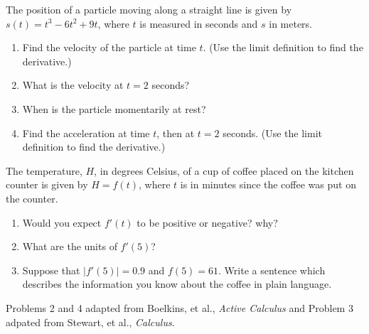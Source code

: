 \documentclass{ximera}
\begin{document}
\begin{exercise}
    The position of a particle moving along a straight line is given by $s(t)=t^3-6t^2+9t$, where $t$ is measured in seconds and $s$ in meters.
    \begin{enumerate}
        \item Find the velocity of the particle at time $t$. (Use the limit definition to find the derivative.)
        \item What is the velocity at $t=2$ seconds?
        \item When is the particle momentarily at rest? 
        \item Find the acceleration at time $t$, then at $t=2$ seconds. (Use the limit definition to find the derivative.)
    \end{enumerate}
\end{exercise}

\begin{exercise}
    The temperature, $H$, in degrees Celsius, of a cup of coffee placed on the kitchen counter is given by $H=f(t)$, where $t$ is in minutes since the coffee was put on the counter.
    \begin{enumerate}
        \item Would you expect $f'(t)$ to be positive or negative?  why? 
        \item What are the units of $f'(5)$?
        \item Suppose that $|f'(5)|=0.9$ and $f(5)=61$.  Write a sentence which describes the information you know about the coffee in plain language.
    \end{enumerate}
\end{exercise}

Problems 2 and 4 adapted from Boelkins, et al., \textit{Active Calculus} and Problem 3 adpated from Stewart, et al., \textit{Calculus}.
\end{document}
